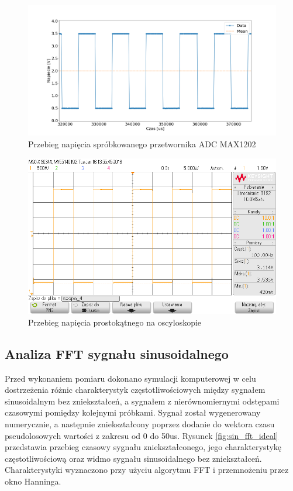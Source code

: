 \begin{figure}[h]
	\centering
		\includegraphics[width=15cm]{rect_max1202_100Hz_adc}
	\caption{Przebieg napięcia spróbkowanego przetwornika ADC MAX1202} 
	\label{fig:rect_max1202_100Hz_adc}
\end{figure}


\begin{figure}[h]
	\centering
		\includegraphics[width=12cm]{rect_max1202_100Hz_osc}
	\caption{Przebieg napięcia prostokątnego na oscyloskopie} 
	\label{fig:rect_max1202_100Hz_osc}
\end{figure}

\subsection{Analiza FFT sygnału sinusoidalnego}

Przed wykonaniem pomiaru dokonano symulacji komputerowej w celu dostrzeżenia różnic charakterystyk częstotliwościowych między sygnałem sinusoidalnym bez zniekształceń, a sygnałem z nierównomiernymi odstępami czasowymi pomiędzy kolejnymi próbkami. 
Sygnał został wygenerowany numerycznie, a następnie zniekształcony poprzez dodanie do wektora czasu pseudolosowych wartości z zakresu od 0 do 50us. Rysunek \ref{fig:sin_fft_ideal} przedstawia przebieg czasowy sygnału zniekształconego, jego charakterystykę częstotliwościową oraz widmo sygnału sinusoidalnego bez zniekształceń. Charakterystyki wyznaczono przy użyciu algorytmu FFT i przemnożeniu przez okno Hanninga.

